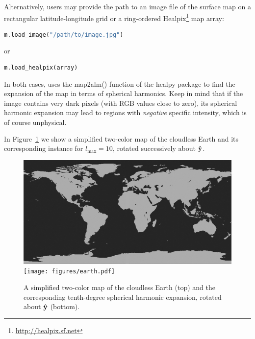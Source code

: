 \documentclass[modern]{aastex61}
\begin{document}
Alternatively, users may provide the path to an image file of the
surface map on a rectangular latitude-longitude grid or a ring-ordered
\textsf{Healpix}\footnote{\url{http://healpix.sf.net}} map array:
%
\begin{lstlisting}[language=Python,firstnumber=last]
m.load_image("/path/to/image.jpg")
\end{lstlisting}
%
or
%
\begin{lstlisting}[language=Python,firstnumber=last]
m.load_healpix(array)
\end{lstlisting}
%
In both cases, \starry uses the \textsf{map2alm()} function
of the \textsf{healpy} package to find the expansion of the map in
terms of spherical harmonics. Keep in mind that if the image contains very dark
pixels (with \textsf{RGB} values close to zero), its spherical harmonic
expansion may lead to regions with \emph{negative} specific intensity, which
is of course unphysical.

In Figure~\ref{fig:earth} we show a
simplified two-color map of the cloudless Earth and its corresponding
\starry instance for
$l_\mathrm{max} = 10$, rotated successively about $\mathbf{\hat{y}}$.
%
\begin{figure}[ht!]
    \begin{centering}
    \includegraphics[width=0.8\linewidth]{figures/earth.jpg}
    \\[1em]
    \texttt{[image: figures/earth.pdf]}
    \caption{\label{fig:earth}
             A simplified two-color map of the cloudless Earth (top) and the
             corresponding tenth-degree spherical harmonic expansion,
             rotated about $\mathbf{\hat{y}}$ (bottom).}
    \end{centering}
\end{figure}
%

\end{document}
